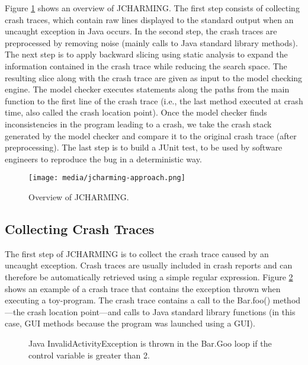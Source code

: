 Figure \ref{fig:jcarming-approach} shows an overview of JCHARMING. The first step
consists of collecting crash traces, which contain raw lines
displayed to the standard output when an uncaught exception
in Java occurs. In the second step, the crash traces are
preprocessed by removing noise (mainly calls to Java standard
library methods). The next step is to apply backward slicing
using static analysis to expand the information contained in
the crash trace while reducing the search space. The resulting
slice along with the crash trace are given as input to the model
checking engine. The model checker executes statements
along the paths from the main function to the first line of the
crash trace (i.e., the last method executed at crash time, also
called the crash location point). Once the model checker finds
inconsistencies in the program leading to a crash, we take the
crash stack generated by the model checker and compare it to
the original crash trace (after preprocessing). The last step is
to build a JUnit test, to be used by software engineers to
reproduce the bug in a deterministic way.

\begin{figure}[h!]
  \centering
    \texttt{[image: media/jcharming-approach.png]}
    \caption{Overview of JCHARMING.
    \label{fig:jcarming-approach}}
\end{figure}

\subsection{Collecting Crash Traces}

The first step of JCHARMING is to collect the crash trace
caused by an uncaught exception. Crash traces are usually included in crash reports and can therefore be automatically
retrieved using a simple regular expression.
Figure \ref{fig:jcarming-traces} shows an example of a crash trace that contains the
exception thrown when executing a toy-program. The crash trace contains a call to the Bar.foo()
method—the crash location point—and calls to Java standard
library functions (in this case, GUI methods because the
program was launched using a GUI).

\begin{figure}[h!]
  \noindent{}
    \caption{Java InvalidActivityException is thrown in the Bar.Goo loop if the control variable is greater than 2.
    \label{fig:jcarming-traces}}
\end{figure}

